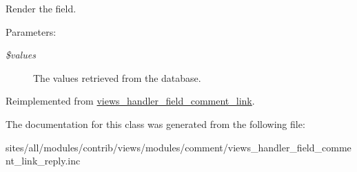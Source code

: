 Render the field.

\begin{Desc}
\item[Parameters:]
\begin{description}
\item[{\em \$values}]The values retrieved from the database. \end{description}
\end{Desc}


Reimplemented from \hyperlink{classviews__handler__field__comment__link_c5e8317cc1a0b2a7688f865662b27dae}{views\_\-handler\_\-field\_\-comment\_\-link}.

The documentation for this class was generated from the following file:\begin{CompactItemize}
\item 
sites/all/modules/contrib/views/modules/comment/views\_\-handler\_\-field\_\-comment\_\-link\_\-reply.inc\end{CompactItemize}
